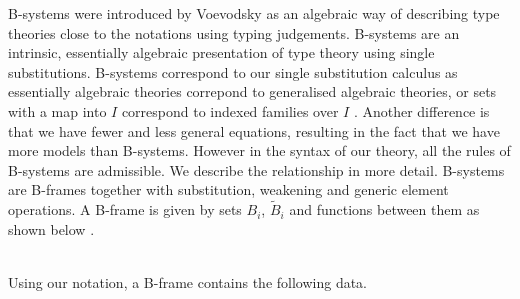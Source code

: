 \documentclass[sigplan,10pt,anonymous,review]{acmart}\settopmatter{printfolios=true,printccs=false,printacmref=false}
\newcommand{\Ty}{\mathsf{Ty}}
\newcommand{\Tm}{\mathsf{Tm}}
\newcommand{\ext}{\mathop{\triangleright}}
\begin{document}
B-systems were introduced by Voevodsky \cite{voevodsky2014bsystems} as
an algebraic way of describing type theories close to the notations
using typing judgements. B-systems are an intrinsic, essentially
algebraic presentation of type theory using single
substitutions. B-systems correspond to our single substitution
calculus as essentially algebraic theories correpond to generalised
algebraic theories, or sets with a map into $I$ correspond to indexed
families over $I$ \cite[page
  221]{DBLP:journals/apal/Cartmell86}. Another difference is that we
have fewer and less general equations, resulting in the fact that we
have more models than B-systems. However in the syntax of our theory,
all the rules of B-systems are admissible. We describe the
relationship in more detail. B-systems are B-frames together with
substitution, weakening and generic element operations. A B-frame is
given by sets $B_i$, $\tilde{B}_i$ and functions between them as shown
below \cite{AHRENS_EMMENEGGER_NORTH_RIJKE_2023}. \\
 \\
Using our notation, a B-frame contains the following data. \\
 \\
\end{document}
